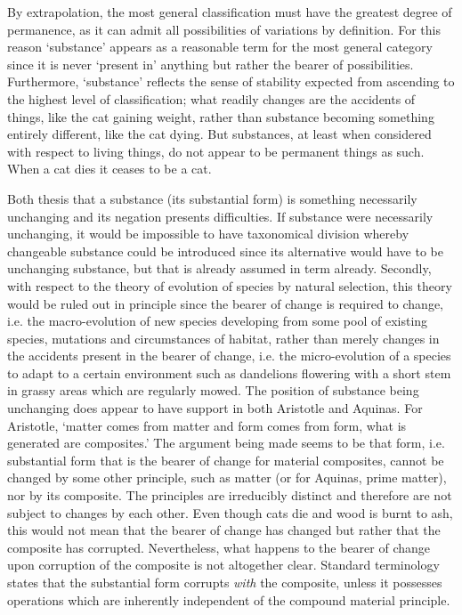 By extrapolation, the most general classification must have the greatest degree of permanence, as it can admit all possibilities of variations by definition. For this reason `substance' appears as a reasonable term for the most general category since it is never `present in' anything but rather the bearer of possibilities. Furthermore, `substance' reflects the sense of stability expected from ascending to the highest level of classification; what readily changes are the accidents of things, like the cat gaining weight, rather than substance becoming something entirely different, like the cat dying. But substances, at least when considered with respect to living things, do not appear to be permanent things as such. When a cat dies it ceases to be a cat.

Both thesis that a substance (its substantial form) is something necessarily unchanging and its negation presents difficulties.
If substance were necessarily unchanging, it would be impossible to have taxonomical division whereby changeable substance could be introduced since its alternative would have to be unchanging substance, but that is already assumed in term already. Secondly, with respect to the theory of evolution of species by natural selection, this theory would be ruled out in principle since the bearer of change is required to change, i.e. the macro-evolution of new species developing from some pool of existing species, mutations and circumstances of habitat, rather than merely changes in the accidents present in the bearer of change, i.e. the micro-evolution of a species to adapt to a certain environment such as dandelions flowering with a short stem in grassy areas which are regularly mowed. The position of substance being unchanging does appear to have support in both Aristotle and Aquinas. For Aristotle, `matter comes from matter and form comes from form, what is generated are composites.' The argument being made seems to be that form, i.e. substantial form that is the bearer of change for material composites,  cannot be changed by some other principle, such as matter (or for Aquinas, prime matter), nor by its composite. The principles are irreducibly distinct and therefore are not subject to changes by each other. Even though cats die and wood is burnt to ash, this would not mean that the bearer of change has changed but rather that the composite has corrupted. Nevertheless, what happens to the bearer of change upon corruption of the composite is not altogether clear. Standard terminology states that the substantial form corrupts \emph{with} the composite, unless it possesses operations which are inherently independent of the compound material principle.

